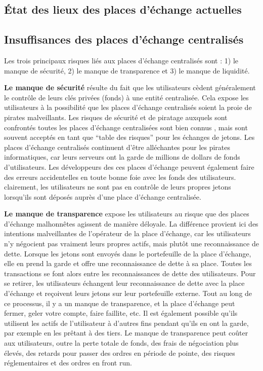 \documentclass[UTF8,nofonts]{article}
\begin{document}
\begin{multicols}{2}
\section{État des lieux des places d'échange actuelles\label{sec:current_exchange_landscape}}

\subsection{Insuffisances des places d'échange centralisés}
Les trois principaux risques liés aux places d'échange centralisés sont : 1) le manque de sécurité, 2) le manque de transparence et 3) le manque de liquidité.

\textbf{Le manque de sécurité} résulte du fait que les utilisateurs cèdent généralement le contrôle de leurs clés privées (fonds) à une entité centralisée. Cela expose les utilisateurs à la possibilité que les places d'échange centralisés soient la proie de pirates malveillants. Les risques de sécurité et de piratage auxquels sont confrontés toutes les places d'échange centralisées sont bien connus \cite{coincheckhack} \cite{mcmillan2014inside}, mais sont souvent acceptés en tant que \enquote{table des risques} pour les échanges de jetons. Les places d’échange centralisés continuent d'être alléchantes pour les pirates informatiques, car leurs serveurs ont la garde de millions de dollars de fonds d'utilisateurs. Les développeurs des ces places d’échange peuvent également faire des erreurs accidentelles en toute bonne foie avec les fonds des utilisateurs. clairement, les utilisateurs ne sont pas en contrôle de leurs propres jetons lorsqu'ils sont déposés auprès d'une place d'échange centralisée.

\textbf{Le manque de transparence} expose les utilisateurs au risque que des places d’échange malhonnêtes agissent de manière déloyale. La différence provient ici des intentions malveillantes de l'opérateur de la place d’échange, car les utilisateurs n’y négocient pas vraiment leurs propres actifs, mais plutôt une reconnaissance de dette. Lorsque les jetons sont envoyés dans le portefeuille de la place d’échange, elle en prend la garde et offre une reconnaissance de dette à sa place. Toutes les transactions se font alors entre les reconnaissances de dette des utilisateurs. Pour se retirer, les utilisateurs échangent leur reconnaissance de dette avec la place d’échange et reçoivent leurs jetons sur leur portefeuille externe. Tout au long de ce processus, il y a un manque de transparence, et la place d'échange peut fermer, geler votre compte, faire faillite, etc. Il est également possible qu'ils utilisent les actifs de l'utilisateur à d'autres fins pendant qu’ils en ont la garde, par exemple en les prêtant à des tiers. Le manque de transparence peut coûter aux utilisateurs, outre la perte totale de fonds,  des frais de négociation plus élevés, des retards pour passer des ordres en période de pointe, des risques réglementaires et des ordres en front run.


\end{multicols}
\end{document}

